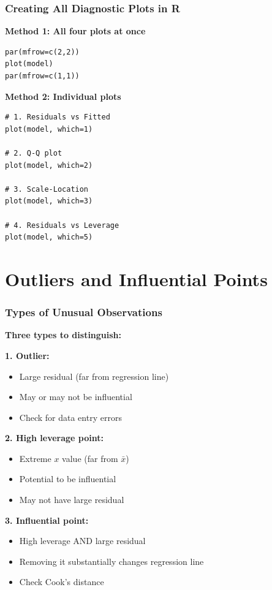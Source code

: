 \documentclass{beamer}
\begin{document}
\begin{frame}[fragile]
\frametitle{Creating All Diagnostic Plots in R}
\textbf{Method 1: All four plots at once}
\small
\begin{verbatim}
par(mfrow=c(2,2))
plot(model)
par(mfrow=c(1,1))
\end{verbatim}

\vspace{0.3cm}
\normalsize
\textbf{Method 2: Individual plots}
\small
\begin{verbatim}
# 1. Residuals vs Fitted
plot(model, which=1)

# 2. Q-Q plot
plot(model, which=2)

# 3. Scale-Location
plot(model, which=3)

# 4. Residuals vs Leverage
plot(model, which=5)
\end{verbatim}
\end{frame}

\section{Outliers and Influential Points}

\begin{frame}
\frametitle{Types of Unusual Observations}
\textbf{Three types to distinguish:}

\vspace{0.3cm}
\textbf{1. Outlier:}
\begin{itemize}
\item Large residual (far from regression line)
\item May or may not be influential
\item Check for data entry errors
\end{itemize}

\vspace{0.3cm}
\textbf{2. High leverage point:}
\begin{itemize}
\item Extreme $x$ value (far from $\bar{x}$)
\item Potential to be influential
\item May not have large residual
\end{itemize}

\vspace{0.3cm}
\textbf{3. Influential point:}
\begin{itemize}
\item High leverage AND large residual
\item Removing it substantially changes regression line
\item Check Cook's distance
\end{itemize}
\end{frame}
\end{document}
